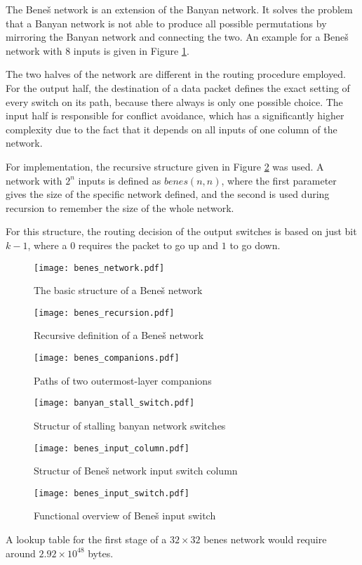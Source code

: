 The Beneš network is an extension of the Banyan network.
It solves the problem that a Banyan network is not able to produce all possible permutations by mirroring the Banyan network and connecting the two.
An example for a Beneš network with 8 inputs is given in Figure \ref{fig:benes}.

The two halves of the network are different in the routing procedure employed.
For the output half, the destination of a data packet defines the exact setting of every switch on its path, because there always is only one possible choice.
The input half is responsible for conflict avoidance, which has a significantly higher complexity due to the fact that it depends on all inputs of one column of the network.

For implementation, the recursive structure given in Figure \ref{fig:benes_recursion} was used.
A network with $2^n$ inputs is defined as $benes(n, n)$, where the first parameter gives the size of the specific network defined, and the second is used during recursion to remember the size of the whole network.

For this structure, the routing decision of the output switches is based on just bit $k - 1$, where a $0$ requires the packet to go up and $1$ to go down.

\begin{figure}[!ht]
	\centering
	\texttt{[image: benes\_network.pdf]}
	\caption{The basic structure of a Beneš network}
	\label{fig:benes}
\end{figure}


\begin{figure}[!ht]
	\centering
	\texttt{[image: benes\_recursion.pdf]}
	\caption{Recursive definition of a Beneš network}
	\label{fig:benes_recursion}
\end{figure}

\begin{figure}[!ht]
	\centering
	\texttt{[image: benes\_companions.pdf]}
	\caption{Paths of two outermost-layer companions}
	\label{fig:benes_companions}
\end{figure}

\begin{figure}[!ht]
	\centering
	\texttt{[image: banyan\_stall\_switch.pdf]}
	\caption{Structur of stalling banyan network switches}
	\label{fig:banyan_stall_switch}
\end{figure}

\begin{figure}[!ht]
	\centering
	\texttt{[image: benes\_input\_column.pdf]}
	\caption{Structur of Beneš network input switch column}
	\label{fig:benes_switchcolumn_in}
\end{figure}

\begin{figure}[!ht]
	\centering
	\texttt{[image: benes\_input\_switch.pdf]}
	\caption{Functional overview of Beneš input switch}
	\label{fig:benes_switch_in}
\end{figure}

 A lookup table for the first stage of a $32\times32$ benes network would require around $2.92\times10^{48}$ bytes.

